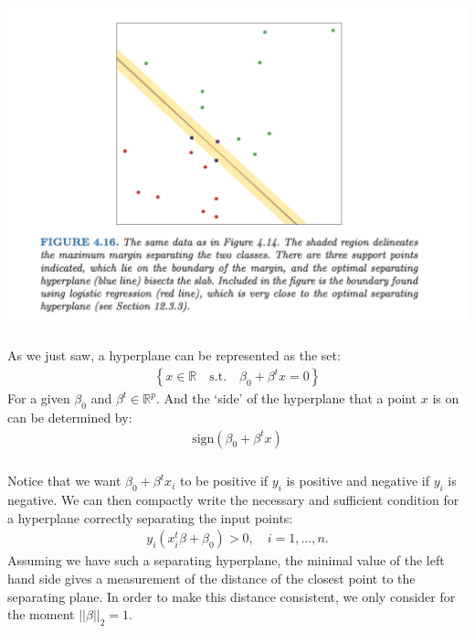 \documentclass[xetex,mathserif,serif,aspectratio=169]{beamer}
\begin{document}
\begin{frame}[fragile] \frametitle{} \oldB \small

\begin{center}
\includegraphics[height=0.7\textheight]{img/split.pdf}
\end{center}

\end{frame}

\begin{frame}[fragile] \frametitle{} \oldB \small

As we just saw, a hyperplane can be represented as the set:
\begin{align*}
\left\{ x \in \mathbb{R} \quad \text{s.t.} \quad \beta_0 + \beta^t x = 0 \right\}
\end{align*}
For a given $\beta_0$ and $\beta^t \in \mathbb{R}^p$. And the
`side' of the hyperplane that a point $x$ is on can be determined by:
\begin{align*}
\text{sign} \left( \beta_0 + \beta^t x \right)
\end{align*}

\end{frame}

\begin{frame}[fragile] \frametitle{} \oldB \small

Notice that we want $\beta_0 + \beta^t x_i$ to be positive if
$y_i$ is positive and negative if $y_i$ is negative. We can
then compactly write the necessary and sufficient condition for
a hyperplane correctly separating the input points:
\begin{align*}
y_i (x_i^t \beta + \beta_0) > 0, \quad i = 1, \ldots, n.
\end{align*}
\pause Assuming we have such a separating hyperplane, the minimal
value of the left hand side gives a measurement of the distance of
the closest point to the separating plane. In order to make this
distance consistent, we only consider for the moment $|| \beta ||_2 = 1$.

\end{frame}
\end{document}

